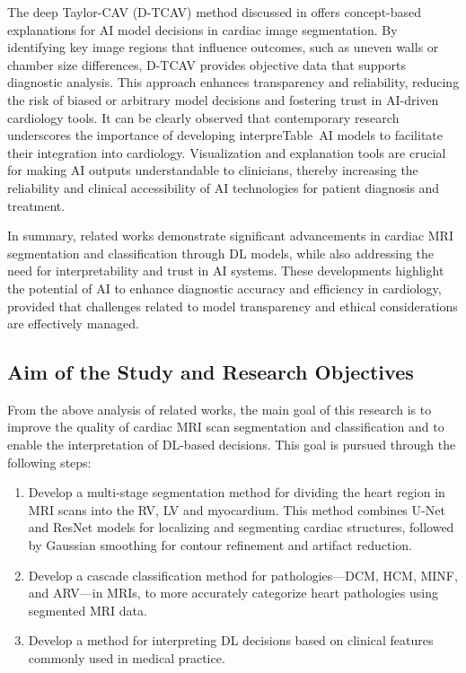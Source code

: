 \documentclass[fleqn,10pt]{wlscirep}
\begin{document}
The deep Taylor-CAV (D-TCAV) method discussed in \cite{Janik:2021} offers concept-based explanations for AI model decisions in cardiac image segmentation. By identifying key image regions that influence outcomes, such as uneven walls or chamber size differences, D-TCAV provides objective data that supports diagnostic analysis. This approach enhances transparency and reliability, reducing the risk of biased or arbitrary model decisions and fostering trust in AI-driven cardiology tools. It can be clearly observed that contemporary research underscores the importance of developing interpreTable~AI models to facilitate their integration into cardiology. Visualization and explanation tools are crucial for making AI outputs understandable to clinicians, thereby increasing the reliability and clinical accessibility of AI technologies for patient diagnosis and treatment.

In summary, related works demonstrate significant advancements in cardiac MRI segmentation and classification through DL models, while also addressing the need for interpretability and trust in AI systems. These developments highlight the potential of AI to enhance diagnostic accuracy and efficiency in cardiology, provided that challenges related to model transparency and ethical considerations are effectively managed.

\subsection*{Aim of the Study and Research Objectives}

From the above analysis of related works, the main goal of this research is to improve the quality of cardiac MRI scan segmentation and classification and to enable the interpretation of DL-based decisions. This goal is pursued through the following steps:

\begin{enumerate}
    \item Develop a multi-stage segmentation method for dividing the heart region in MRI scans into the RV, LV and myocardium. This method combines U-Net and ResNet models for localizing and segmenting cardiac structures, followed by Gaussian smoothing for contour refinement and artifact reduction.
    \item Develop a cascade classification method for pathologies---DCM, HCM, MINF, and ARV---in MRIs, to more accurately categorize heart pathologies using segmented MRI data.
    \item Develop a method for interpreting DL decisions based on clinical features commonly used in medical practice.
\end{enumerate}
\end{document}
